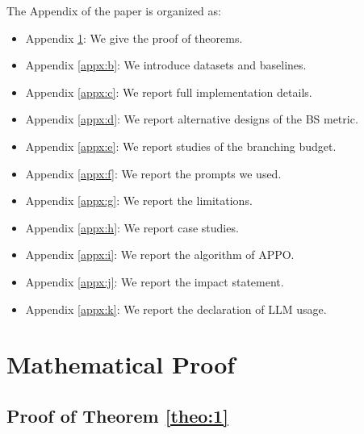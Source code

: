 \documentclass{article}
\begin{document}
 \begin{center}\Large{\textbf{}}\end{center}
The Appendix of the paper is organized as:
\begin{itemize}
    \item Appendix \ref{appx:a}: We give the proof of theorems.
    \item Appendix \ref{appx:b}: We introduce datasets and baselines.
    \item Appendix \ref{appx:c}: We report full implementation details.
    \item Appendix \ref{appx:d}: We report alternative designs of the BS metric.
    \item Appendix \ref{appx:e}: We report studies of the branching budget.
    \item Appendix \ref{appx:f}: We report the prompts we used.
    \item Appendix \ref{appx:g}: We report the limitations.
    \item Appendix \ref{appx:h}: We report case studies.
    \item Appendix \ref{appx:i}: We report the algorithm of APPO. 
    \item Appendix \ref{appx:j}: We report the impact statement. 
    \item Appendix \ref{appx:k}: We report the declaration of LLM usage. 
\end{itemize}

\section{Mathematical Proof}
\label{appx:a}

\subsection{Proof of Theorem \ref{theo:1}} 
\label{proof:theorem1}
\end{document}
